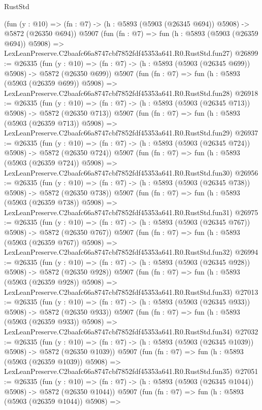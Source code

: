 \begin{lexlean}{RustStd}
\begin{coremodule}
    (fun (y : @10) => (fn : @7) -> (h : @5893 (@5903 (@26345 @694)) @5908) -> @5872 (@26350 @694))
    @5907
    (fun (fn : @7) =>
    fun (h : @5893 (@5903 (@26359 @694)) @5908) =>
    LexLeanPreserve.C2baafc66a8747cbf7852fdf45353a641.R0.RustStd.fun27)
@26899 := @26335
    (fun (y : @10) => (fn : @7) -> (h : @5893 (@5903 (@26345 @699)) @5908) -> @5872 (@26350 @699))
    @5907
    (fun (fn : @7) =>
    fun (h : @5893 (@5903 (@26359 @699)) @5908) =>
    LexLeanPreserve.C2baafc66a8747cbf7852fdf45353a641.R0.RustStd.fun28)
@26918 := @26335
    (fun (y : @10) => (fn : @7) -> (h : @5893 (@5903 (@26345 @713)) @5908) -> @5872 (@26350 @713))
    @5907
    (fun (fn : @7) =>
    fun (h : @5893 (@5903 (@26359 @713)) @5908) =>
    LexLeanPreserve.C2baafc66a8747cbf7852fdf45353a641.R0.RustStd.fun29)
@26937 := @26335
    (fun (y : @10) => (fn : @7) -> (h : @5893 (@5903 (@26345 @724)) @5908) -> @5872 (@26350 @724))
    @5907
    (fun (fn : @7) =>
    fun (h : @5893 (@5903 (@26359 @724)) @5908) =>
    LexLeanPreserve.C2baafc66a8747cbf7852fdf45353a641.R0.RustStd.fun30)
@26956 := @26335
    (fun (y : @10) => (fn : @7) -> (h : @5893 (@5903 (@26345 @738)) @5908) -> @5872 (@26350 @738))
    @5907
    (fun (fn : @7) =>
    fun (h : @5893 (@5903 (@26359 @738)) @5908) =>
    LexLeanPreserve.C2baafc66a8747cbf7852fdf45353a641.R0.RustStd.fun31)
@26975 := @26335
    (fun (y : @10) => (fn : @7) -> (h : @5893 (@5903 (@26345 @767)) @5908) -> @5872 (@26350 @767))
    @5907
    (fun (fn : @7) =>
    fun (h : @5893 (@5903 (@26359 @767)) @5908) =>
    LexLeanPreserve.C2baafc66a8747cbf7852fdf45353a641.R0.RustStd.fun32)
@26994 := @26335
    (fun (y : @10) => (fn : @7) -> (h : @5893 (@5903 (@26345 @928)) @5908) -> @5872 (@26350 @928))
    @5907
    (fun (fn : @7) =>
    fun (h : @5893 (@5903 (@26359 @928)) @5908) =>
    LexLeanPreserve.C2baafc66a8747cbf7852fdf45353a641.R0.RustStd.fun33)
@27013 := @26335
    (fun (y : @10) => (fn : @7) -> (h : @5893 (@5903 (@26345 @933)) @5908) -> @5872 (@26350 @933))
    @5907
    (fun (fn : @7) =>
    fun (h : @5893 (@5903 (@26359 @933)) @5908) =>
    LexLeanPreserve.C2baafc66a8747cbf7852fdf45353a641.R0.RustStd.fun34)
@27032 := @26335
    (fun (y : @10) => (fn : @7) -> (h : @5893 (@5903 (@26345 @1039)) @5908) -> @5872 (@26350 @1039))
    @5907
    (fun (fn : @7) =>
    fun (h : @5893 (@5903 (@26359 @1039)) @5908) =>
    LexLeanPreserve.C2baafc66a8747cbf7852fdf45353a641.R0.RustStd.fun35)
@27051 := @26335
    (fun (y : @10) => (fn : @7) -> (h : @5893 (@5903 (@26345 @1044)) @5908) -> @5872 (@26350 @1044))
    @5907
    (fun (fn : @7) =>
    fun (h : @5893 (@5903 (@26359 @1044)) @5908) =>

\end{coremodule}
\end{lexlean}

